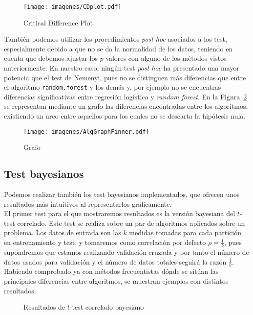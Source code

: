 \begin{figure}[H]
\centering
\caption{Critical Difference Plot}
\label{fig:cdplot}
\texttt{[image: imagenes/CDplot.pdf]}
\end{figure}

	También podemos utilizar los procedimientos \textit{post
hoc} asociados a los test, especialmente debido a que no
se da la normalidad de los datos, teniendo en cuenta que
debemos ajustar los $p$-valores con alguno de los métodos
vistos anteriormente. En nuestro caso, ningún test 
\textit{post hoc} ha presentado una mayor potencia que el
test de Nemenyi, pues no se distinguen más diferencias que 
entre el algoritmo \texttt{random.forest} y los demás y, por
ejemplo no se encuentras diferencias significativas entre  
regresión logística y \textit{random forest}. En la Figura~\ref{fig:grafo}
se representan mediante un grafo las diferencias encontradas
entre los algoritmos, existiendo un arco entre aquellos 
para los cuales no se descarta la hipótesis nula.

\begin{figure}[H]
\centering
\caption{Grafo}
\label{fig:grafo}
\texttt{[image: imagenes/AlgGraphFinner.pdf]}
\end{figure}

\subsection*{Test bayesianos}

	Podemos realizar también los test bayesianos implementados, 
que ofrecen unos resultados más intuitivos al representarlos
gráficamente.\\
	El primer test para el que mostraremos resultados es
la versión bayesiana del $t$-test correlado. Este test
se realiza sobre un par de algoritmos aplicados sobre un
problema. Los datos de entrada son las $k$ medidas tomadas
para cada partición en entrenamiento y test, y tomaremos 
como correlación por defecto $\rho = \frac{1}{k}$, pues
supondremos que estamos realizando validación cruzada y 
por tanto el número de datos usados para validación y el 
número de datos totales seguirá la razón $\frac{1}{k}$.\\
Habiendo comprobado ya con métodos frecuentistas dónde se
sitúan las principales diferencias entre algoritmos, se
muestran ejemplos con distintos resultados.

\begin{figure}[H]
\centering
{}
   \newline
   \centering
\caption{Resultados de $t$-test correlado bayesiano}
\end{figure}

